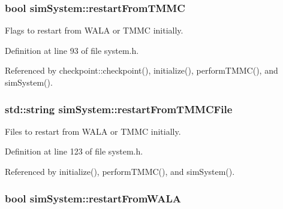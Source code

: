 \hypertarget{classsim_system_a0c81d3b606c070c801f8d86288e44391}{
\subsubsection[{restart\-From\-T\-M\-M\-C}]{\setlength{\rightskip}{0pt plus 5cm}bool sim\-System\-::restart\-From\-T\-M\-M\-C}}\label{classsim_system_a0c81d3b606c070c801f8d86288e44391}


Flags to restart from W\-A\-L\-A or T\-M\-M\-C initially. 



Definition at line 93 of file system.\-h.



Referenced by checkpoint\-::checkpoint(), initialize(), perform\-T\-M\-M\-C(), and sim\-System().

\hypertarget{classsim_system_a5ccdad82b3767ba21b1e4b1e36362082}{
\subsubsection[{restart\-From\-T\-M\-M\-C\-File}]{\setlength{\rightskip}{0pt plus 5cm}std\-::string sim\-System\-::restart\-From\-T\-M\-M\-C\-File}}\label{classsim_system_a5ccdad82b3767ba21b1e4b1e36362082}


Files to restart from W\-A\-L\-A or T\-M\-M\-C initially. 



Definition at line 123 of file system.\-h.



Referenced by initialize(), perform\-T\-M\-M\-C(), and sim\-System().

\hypertarget{classsim_system_a2b168c89742f4d64270583e7e54b2929}{
\subsubsection[{restart\-From\-W\-A\-L\-A}]{\setlength{\rightskip}{0pt plus 5cm}bool sim\-System\-::restart\-From\-W\-A\-L\-A}}\label{classsim_system_a2b168c89742f4d64270583e7e54b2929}


